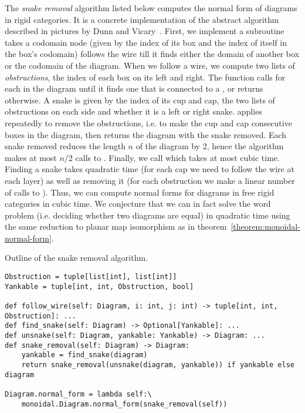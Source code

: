 The \emph{snake removal} algorithm listed below computes the normal form of diagrams in rigid categories.
It is a concrete implementation of the abstract algorithm described in pictures by Dunn and Vicary~\cite[2.12]{DunnVicary19}.
First, we implement a subroutine  takes a codomain node (given by the index  of its box and the index  of itself in the box's codomain)
follows the wire till it finds either the domain of another box or the codomain of the diagram.
When we follow a wire, we compute two lists of \emph{obstructions}, the index of each box on its left and right.
The  function calls  for each  in the diagram until it finds one that is connected to a , or returns  otherwise.
A  snake is given by the index of its cup and cap, the two lists of obstructions on each side and whether it is a left or right snake.
 applies  repeatedly to remove the obstructions, i.e. to make the cup and cap consecutive boxes in the diagram, then returns the diagram with the snake removed.
Each snake removed reduces the length $n$ of the diagram by 2, hence the  algorithm makes at most $n / 2$ calls to .
Finally, we call  which takes at most cubic time.
Finding a snake takes quadratic time (for each cap we need to follow the wire at each layer) as well as removing it (for each obstruction we make a linear number of calls to ).
Thus, we can compute normal forms for diagrams in free rigid categories in cubic time.
We conjecture that we can in fact solve the word problem (i.e. deciding whether two diagrams are equal) in quadratic time using the same reduction to planar map isomorphism as in theorem~\ref{theorem:monoidal-normal-form}.

\begin{python}
{\normalfont Outline of the snake removal algorithm.}

\begin{verbatim}
Obstruction = tuple[list[int], list[int]]
Yankable = tuple[int, int, Obstruction, bool]

def follow_wire(self: Diagram, i: int, j: int) -> tuple[int, int, Obstruction]: ...
def find_snake(self: Diagram) -> Optional[Yankable]: ...
def unsnake(self: Diagram, yankable: Yankable) -> Diagram: ...
def snake_removal(self: Diagram) -> Diagram:
    yankable = find_snake(diagram)
    return snake_removal(unsnake(diagram, yankable)) if yankable else diagram

Diagram.normal_form = lambda self:\
    monoidal.Diagram.normal_form(snake_removal(self))
\end{verbatim}
\end{python}

